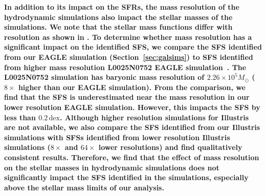 \documentclass[tighten, preprint]{aastex62}
\begin{document}
{\bf \color{red} 
In addition to its impact on the SFRs, the mass resolution of the hydrodynamic 
simulations also impact the stellar masses of the simulations. We note that the stellar mass functions differ with resolution as shown in \citet{schaye2015, genel2014, dave2016}. To determine
whether mass resolution has a significant impact on the identified
SFS, we compare the SFS identified from our EAGLE simulation 
(Section~\ref{sec:galsims}) to SFS identified from higher mass resolution 
L0025N0752 EAGLE simulation~\citep{schaye2015}. The L0025N0752 simulation
has baryonic mass resolution of $2.26 \times 10^5 M_\odot$ ($8 \times$ 
higher than our EAGLE simulation). From the comparison, we find that 
the SFS is underestimated near the mass resolution in our lower resolution 
EAGLE simulation. However, this impacts the SFS by less than 
$0.2\,\mathrm{dex}$. Although higher resolution simulations for Illustris 
are not available, we also compare the SFS identified from our Illustris 
simulations with SFSs identified from lower resolution Illustris simulations 
($8\times$ and $64\times$ lower resolutions) and find qualitatively 
consistent results. Therefore, we find that the effect of mass resolution 
on the stellar masses in hydrodynamic simulations does not significantly 
impact the SFS identified in the simulations, especially above the stellar 
mass  limits of our analysis.
}



\end{document}
